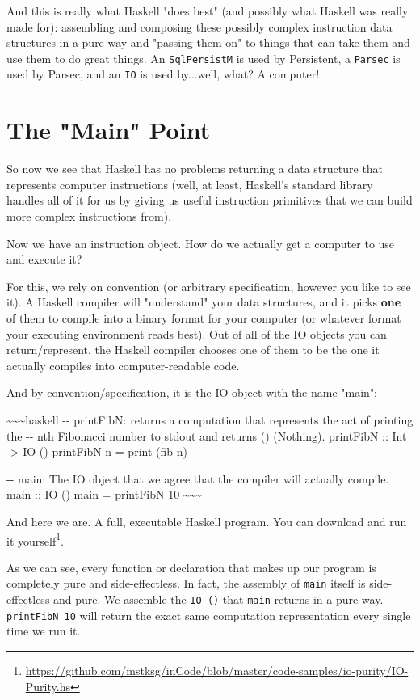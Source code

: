 \documentclass[]{article}
\renewcommand{\href}[2]{#2\footnote{\url{#1}}}
\begin{document}
And this is really what Haskell "does best" (and possibly what Haskell was
really made for): assembling and composing these possibly complex instruction
data structures in a pure way and "passing them on" to things that can take them
and use them to do great things. An \texttt{SqlPersistM} is used by Persistent,
a \texttt{Parsec} is used by Parsec, and an \texttt{IO} is used by...well, what?
A computer!

\section{The "Main" Point}

So now we see that Haskell has no problems returning a data structure that
represents computer instructions (well, at least, Haskell's standard library
handles all of it for us by giving us useful instruction primitives that we can
build more complex instructions from).

Now we have an instruction object. How do we actually get a computer to use and
execute it?

For this, we rely on convention (or arbitrary specification, however you like to
see it). A Haskell compiler will "understand" your data structures, and it picks
\textbf{one} of them to compile into a binary format for your computer (or
whatever format your executing environment reads best). Out of all of the IO
objects you can return/represent, the Haskell compiler chooses one of them to be
the one it actually compiles into computer-readable code.

And by convention/specification, it is the IO object with the name "main":

\textasciitilde{}\textasciitilde{}\textasciitilde{}haskell -\/- printFibN:
returns a computation that represents the act of printing the -\/- nth Fibonacci
number to stdout and returns () (Nothing). printFibN :: Int -\textgreater{} IO
() printFibN n = print (fib n)

-\/- main: The IO object that we agree that the compiler will actually compile.
main :: IO () main = printFibN 10
\textasciitilde{}\textasciitilde{}\textasciitilde{}

And here we are. A full, executable Haskell program. You can
\href{https://github.com/mstksg/inCode/blob/master/code-samples/io-purity/IO-Purity.hs}{download
and run it yourself}.

As we can see, every function or declaration that makes up our program is
completely pure and side-effectless. In fact, the assembly of \texttt{main}
itself is side-effectless and pure. We assemble the \texttt{IO\ ()} that
\texttt{main} returns in a pure way. \texttt{printFibN\ 10} will return the
exact same computation representation every single time we run it.
\end{document}
